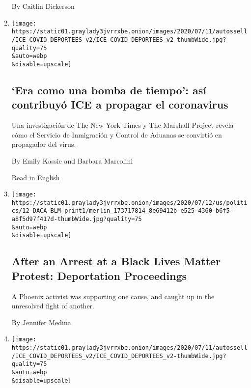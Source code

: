 \begin{enumerate}
  By Caitlin Dickerson
\item
  \href{/es/2020/07/13/espanol/mundo/coronavirus-deportaciones-ice.html}{}

  \texttt{[image: https://static01.graylady3jvrrxbe.onion/images/2020/07/11/autossell/ICE\_COVID\_DEPORTEES\_v2/ICE\_COVID\_DEPORTEES\_v2-thumbWide.jpg?quality=75\\\&auto=webp\\\&disable=upscale]}

  \hypertarget{era-como-una-bomba-de-tiempo-asuxed-contribuyuxf3-ice-a-propagar-el-coronavirus}{%
  \subsection{`Era como una bomba de tiempo': así contribuyó ICE a
  propagar el
  coronavirus}\label{era-como-una-bomba-de-tiempo-asuxed-contribuyuxf3-ice-a-propagar-el-coronavirus}}

  Una investigación de The New York Times y The Marshall Project revela
  cómo el Servicio de Inmigración y Control de Aduanas se convirtió en
  propagador del virus.

  By Emily Kassie and Barbara Marcolini

  \href{https://www.nytimes3xbfgragh.onion/2020/07/10/us/ice-coronavirus-deportation.html}{Read
  in English}
\item
  \href{/2020/07/11/us/politics/black-lives-matter-phoenix-daca.html}{}

  \texttt{[image: https://static01.graylady3jvrrxbe.onion/images/2020/07/12/us/politics/12-DACA-BLM-print1/merlin\_173717814\_8e69412b-e525-4360-b6f5-a8f5d97f417d-thumbWide.jpg?quality=75\\\&auto=webp\\\&disable=upscale]}

  \hypertarget{after-an-arrest-at-a-black-lives-matter-protest-deportation-proceedings}{%
  \subsection{After an Arrest at a Black Lives Matter Protest:
  Deportation
  Proceedings}\label{after-an-arrest-at-a-black-lives-matter-protest-deportation-proceedings}}

  A Phoenix activist was supporting one cause, and caught up in the
  unresolved fight of another.

  By Jennifer Medina
\item
  \href{/2020/07/10/us/ice-coronavirus-deportation.html}{}

  \texttt{[image: https://static01.graylady3jvrrxbe.onion/images/2020/07/11/autossell/ICE\_COVID\_DEPORTEES\_v2/ICE\_COVID\_DEPORTEES\_v2-thumbWide.jpg?quality=75\\\&auto=webp\\\&disable=upscale]}


\end{enumerate}
